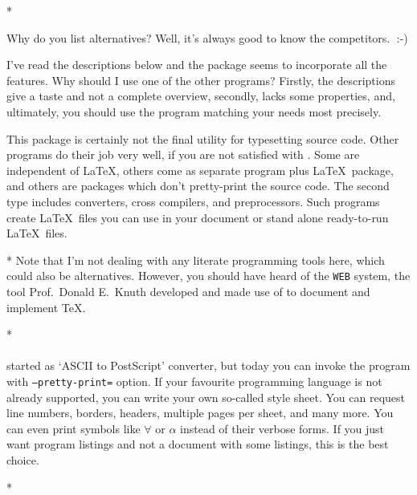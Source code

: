 \begin{paracol}{2}
\begin{paracol}{2}
{\switchcolumn[0]*%
\begin{advise}
\item Why do you list alternatives?
      \advisespace
      Well, it's always good to know the competitors.^^A :-)
\item I've read the descriptions below and the  package
      seems to incorporate all the features. Why should I use one of the
      other programs?
      \advisespace
      Firstly, the descriptions give a taste and not a complete overview,
      secondly,  lacks some properties, and, ultimately,
      you should use the program matching your needs most precisely.
\end{advise}
This package is certainly not the final utility for typesetting source code.
Other programs do their job very well, if you are not satisfied with
. Some are independent of \LaTeX, others come as
separate program plus \LaTeX\ package, and others are packages which
don't pretty-print the source code. The second type includes converters,
cross compilers, and preprocessors. Such programs create \LaTeX\ files
you can use in your document or stand alone ready-to-run \LaTeX\ files.
\switchcolumn

\switchcolumn[0]*%
Note that I'm not dealing with any literate programming tools here, which
could also be alternatives. However, you should have heard of the
\texttt{WEB} system, the tool Prof.~Donald E.~Knuth developed and made use
of to document and implement \TeX.
\switchcolumn

\switchcolumn[0]*%
\paragraph{\href{http://www.infres.enst.fr/~demaille/a2ps}{}}
started as `ASCII to PostScript' converter, but today you can invoke the
program with \texttt{--pretty-print=} option. If your
favourite programming language is not already supported, you can write your
own so-called style sheet. You can request line numbers, borders, headers,
multiple pages per sheet, and many more. You can even print symbols like
$\forall$ or $\alpha$ instead of their verbose forms. If you just want
program listings and not a document with some listings, this is the best
choice.
\switchcolumn

\switchcolumn[0]*%
}
\end{paracol}
\end{paracol}
